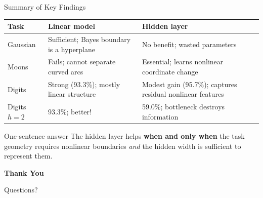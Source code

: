 \documentclass[11pt,aspectratio=169]{beamer}
\begin{document}
\begin{frame}{Summary of Key Findings}

\begin{center}
\begin{tabular}{@{}lp{5.5cm}p{5.5cm}@{}}
\toprule
\textbf{Task} & \textbf{Linear model} & \textbf{Hidden layer} \\
\midrule
Gaussian & \textcolor{accentgreen}{Sufficient}; Bayes boundary is a hyperplane & No benefit; wasted parameters \\[4pt]
Moons & \textcolor{accentred}{Fails}; cannot separate curved arcs & \textcolor{accentgreen}{Essential}; learns nonlinear coordinate change \\[4pt]
Digits & \textcolor{accentgreen}{Strong} (93.3\%); mostly linear structure & \textcolor{accentgreen}{Modest gain} (95.7\%); captures residual nonlinear features \\[4pt]
Digits $h{=}2$ & \textcolor{accentgreen}{93.3\%};  better! & \textcolor{accentred}{59.0\%}; bottleneck destroys information \\
\bottomrule
\end{tabular}
\end{center}

\vspace{0.4em}

\begin{block}{One-sentence answer}
The hidden layer helps \textbf{when and only when} the task geometry requires nonlinear boundaries \textit{and} the hidden width is sufficient to represent them.
\end{block}

\end{frame}

\begin{frame}{}

\vfill
\centering
{\LARGE \textbf{Thank You}}

\vspace{1em}
{\large Questions?}

\vspace{2em}
\vfill

\end{frame}
\end{document}

